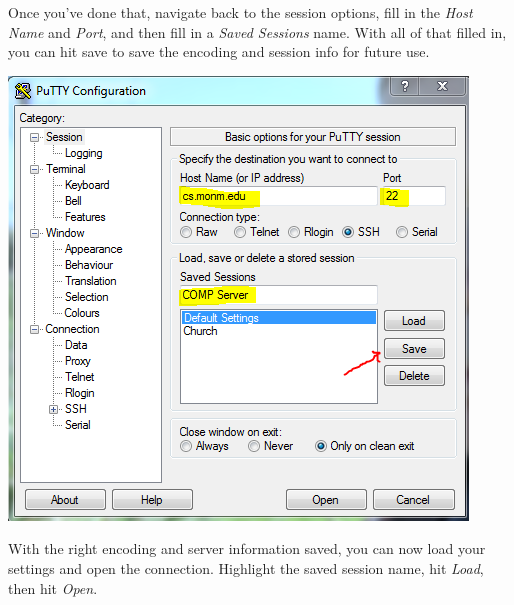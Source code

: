 \documentclass[nobib]{tufte-handout}
\begin{document}
Once you've done that, navigate back to the session options, fill in the \textit{Host Name} and \textit{Port}, and then fill in a \textit{Saved Sessions} name. With all of that filled in, you can hit save to save the encoding and session info for future use.

\vspace{.1in}
\begin{center}
\includegraphics[scale=.75]{Putty-SaveSettings.png}
\end{center}
\vspace{.1in}

With the right encoding and server information saved, you can now load your settings and open the connection. Highlight the saved session name, hit \textit{Load}, then hit \textit{Open}.
\end{document}
